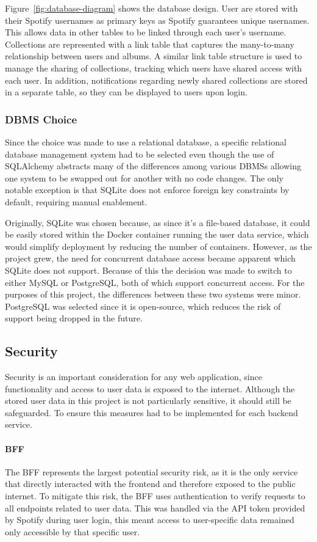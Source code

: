 Figure~\ref{fig:database-diagram} shows the database design. User are stored with their Spotify usernames as primary keys as Spotify guarantees unique usernames. This allows data in other tables to be linked through each user’s username. Collections are represented with a link table that captures the many-to-many relationship between users and albums. A similar link table structure is used to manage the sharing of collections, tracking which users have shared access with each user. In addition, notifications regarding newly shared collections are stored in a separate table, so they can be displayed to users upon login.

\subsubsection{DBMS Choice}
Since the choice was made to use a relational database, a specific relational database management system had to be selected even though the use of SQLAlchemy abstracts many of the differences among various DBMSs allowing one system to be swapped out for another with no code changes. The only notable exception is that SQLite does not enforce foreign key constraints by default, requiring manual enablement.

Originally, SQLite was chosen because, as since it's a file-based database, it could be easily stored within the Docker container running the user data service, which would simplify deployment by reducing the number of containers. However, as the project grew, the need for concurrent database access became apparent which SQLite does not support. Because of this the decision was made to switch to either MySQL or PostgreSQL, both of which support concurrent access. For the purposes of this project, the differences between these two systems were minor. PostgreSQL was selected since it is open-source, which reduces the risk of support being dropped in the future.

\subsection{Security}
Security is an important consideration for any web application, since functionality and access to user data is exposed to the internet. Although the stored user data in this project is not particularly sensitive, it should still be safeguarded. To ensure this measures had to be implemented for each backend service.

\paragraph{BFF} The BFF represents the largest potential security risk, as it is the only service that directly interacted with the frontend and therefore exposed to the public internet. To mitigate this risk, the BFF uses authentication to verify requests to all endpoints related to user data. This was handled via the API token provided by Spotify during user login, this meant access to user-specific data remained only accessible by that specific user.

